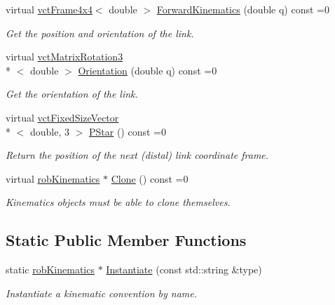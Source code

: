 \begin{DoxyCompactItemize}
virtual \hyperlink{classvct_frame4x4}{vct\-Frame4x4}$<$ double $>$ \hyperlink{classrob_kinematics_a1307677fa8f4846a62da3bf934efb9d6}{Forward\-Kinematics} (double q) const =0
\begin{DoxyCompactList}\small\item\em Get the position and orientation of the link. \end{DoxyCompactList}\item 
virtual \hyperlink{classvct_matrix_rotation3}{vct\-Matrix\-Rotation3}\\*
$<$ double $>$ \hyperlink{classrob_kinematics_ada1e684fd3b33fb8c0cfbf32f4099e83}{Orientation} (double q) const =0
\begin{DoxyCompactList}\small\item\em Get the orientation of the link. \end{DoxyCompactList}\item 
virtual \hyperlink{classvct_fixed_size_vector}{vct\-Fixed\-Size\-Vector}\\*
$<$ double, 3 $>$ \hyperlink{classrob_kinematics_a29ea3c6823445630d7d84cc38887fb3a}{P\-Star} () const =0
\begin{DoxyCompactList}\small\item\em Return the position of the next (distal) link coordinate frame. \end{DoxyCompactList}\item 
virtual \hyperlink{classrob_kinematics}{rob\-Kinematics} $\ast$ \hyperlink{classrob_kinematics_a01c1be909edee0615544e081da5ee721}{Clone} () const =0
\begin{DoxyCompactList}\small\item\em Kinematics objects must be able to clone themselves. \end{DoxyCompactList}\end{DoxyCompactItemize}
\subsection*{Static Public Member Functions}
\begin{DoxyCompactItemize}
\item 
static \hyperlink{classrob_kinematics}{rob\-Kinematics} $\ast$ \hyperlink{classrob_kinematics_ab9d416cf2f00db0c67d107b9ecc28623}{Instantiate} (const std\-::string \&type)
\begin{DoxyCompactList}\small\item\em Instantiate a kinematic convention by name. \end{DoxyCompactList}\end{DoxyCompactItemize}
